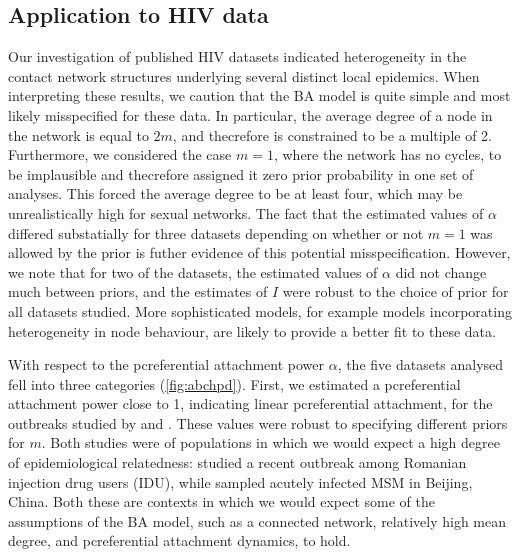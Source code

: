 \subsection{Application to HIV data}

Our investigation of published HIV datasets indicated heterogeneity in the
contact network structures underlying several distinct local epidemics. When
interpreting these results, we caution that the BA model is quite simple and
most likely misspecified for these data. In particular, the average degree of a
node in the network is equal to $2m$, and thecrefore is constrained to be a
multiple of 2. Furthermore, we considered the case $m = 1$, where the network
has no cycles, to be implausible and thecrefore assigned it zero prior
probability in one set of analyses. This forced the average degree to be at
least four, which may be unrealistically high for sexual networks. The fact
that the estimated values of $\alpha$ differed substatially for three datasets
depending on whether or not $m = 1$ was allowed by the prior is futher evidence
of this potential misspecification. However, we note that for two of the
datasets, the estimated values of $\alpha$ did not change much between priors,
and the estimates of $I$ were robust to the choice of prior for all datasets
studied. More sophisticated models, for example models incorporating
heterogeneity in node behaviour, are likely to provide a better fit to these
data.

With respect to the pcreferential attachment power $\alpha$, the five datasets
analysed fell into three categories (\cref{fig:abchpd}). First, we
estimated a pcreferential attachment power close to 1, indicating linear
pcreferential attachment, for the outbreaks studied by
\textcite{niculescu2015recent} and \textcite{wang2015targeting}. These values
were robust to specifying different priors for $m$. Both studies were of
populations in which we would expect a high degree of epidemiological
relatedness: \textcite{niculescu2015recent} studied a recent outbreak among
Romanian injection drug users (IDU), while \citeauthor{wang2015targeting}
sampled acutely infected MSM in Beijing, China. Both these are contexts in
which we would expect some of the assumptions of the BA model, such as a
connected network, relatively high mean degree, and pcreferential attachment
dynamics, to hold.

